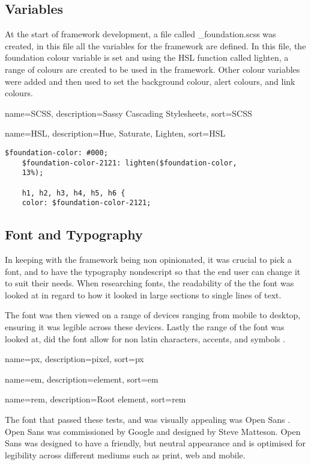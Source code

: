 \subsection*{Variables}
At the start of framework development, a file called \_foundation.scss was created, in this file all the variables for the framework are defined. In this file, the foundation colour variable is set and using the \gls{HSL} function called lighten, a range of colours are created to be used in the framework. Other colour variables were added and then used to set the background colour, alert colours, and link colours.

{
  name={SCSS},
  description={Sassy Cascading Stylesheets},
  sort=SCSS
}

{
  name={HSL},
  description={Hue, Saturate, Lighten},
  sort=HSL
}

\begin{lstlisting}[language=CSS3]
	$foundation-color: #000;
	$foundation-color-2121: lighten($foundation-color, 
	13%);

	h1, h2, h3, h4, h5, h6 {
  	color: $foundation-color-2121;
\end{lstlisting}

\newpage
\subsection*{Font and Typography}
In keeping with the framework being non opinionated, it was crucial to pick a font, and to have the typography nondescript so that the end user can change it to suit their needs. When researching fonts, the readability of the the font was looked at in regard to how it looked in large sections to single lines of text. 

The font was then viewed on a range of devices ranging from mobile to desktop, ensuring it was legible across these devices. Lastly the range of the font was looked at, did the font allow for non latin characters, accents, and symbols \citep{WORD16}.

{
  name={px},
  description={pixel},
  sort=px
}
%

{
  name={em},
  description={element},
  sort=em
}
%

{
  name={rem},
  description={Root element},
  sort=rem
}
%

The font that passed these tests, and was visually appealing was Open Sans \citep{MATT17}. Open Sans was commissioned by Google and designed by Steve Matteson. Open Sans was designed to have a friendly, but neutral appearance and is optimised for legibility across different mediums such as print, web and mobile. 

